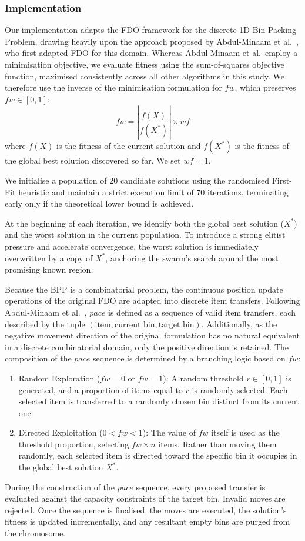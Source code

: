 \documentclass[11pt]{article}
\begin{document}
\subsubsection{Implementation}
Our implementation adapts the FDO framework for the discrete 1D Bin
Packing Problem, drawing heavily upon the approach proposed by
Abdul-Minaam et al.\ \cite{abdulminaam}, who first adapted FDO for
this domain. Whereas Abdul-Minaam et al.\ employ a minimisation
objective, we evaluate fitness using the sum-of-squares objective
function, maximised consistently across all other algorithms in this
study. We therefore use the inverse of the minimisation formulation
for $fw$, which preserves $fw \in [0,1]$:
$$fw = \left| \frac{f(X)}{f(X^*)} \right| \times wf$$
where $f(X)$ is the fitness of the current solution and $f(X^*)$ is
the fitness of the global best solution discovered so far. We set
$wf = 1$.

We initialise a population of 20 candidate solutions using the
randomised First-Fit heuristic and maintain a strict execution limit
of 70 iterations, terminating early only if the theoretical lower
bound is achieved.

At the beginning of each iteration, we identify both the global best
solution ($X^*$) and the worst solution in the current population. To
introduce a strong elitist pressure and accelerate convergence, the
worst solution is immediately overwritten by a copy of $X^*$, anchoring
the swarm's search around the most promising known region.

Because the BPP is a combinatorial problem, the continuous position
update operations of the original FDO are adapted into discrete item
transfers. Following Abdul-Minaam et al.\ \cite{abdulminaam}, $pace$
is defined as a sequence of valid item transfers, each described by
the tuple $(\text{item}, \text{current bin}, \text{target bin})$.
Additionally, as the negative movement direction of the original
formulation has no natural equivalent in a discrete combinatorial
domain, only the positive direction is retained. The composition of
the $pace$ sequence is determined by a branching logic based on $fw$:
\begin{enumerate}
    \item Random Exploration ($fw = 0$ or $fw = 1$): A random threshold
    $r \in [0,1]$ is generated, and a proportion of items equal to $r$
    is randomly selected. Each selected item is transferred to a
    randomly chosen bin distinct from its current one.
    \item Directed Exploitation ($0 < fw < 1$): The value of
    $fw$ itself is used as the threshold proportion, selecting $fw \times
    n$ items. Rather than moving them randomly, each selected item is
    directed toward the specific bin it occupies in the global best
    solution $X^*$.
\end{enumerate}
During the construction of the $pace$ sequence, every proposed transfer is
evaluated against the capacity constraints of the target bin. Invalid
moves are rejected. Once the sequence is finalised, the moves are
executed, the solution's fitness is updated incrementally, and any
resultant empty bins are purged from the chromosome.
\end{document}
